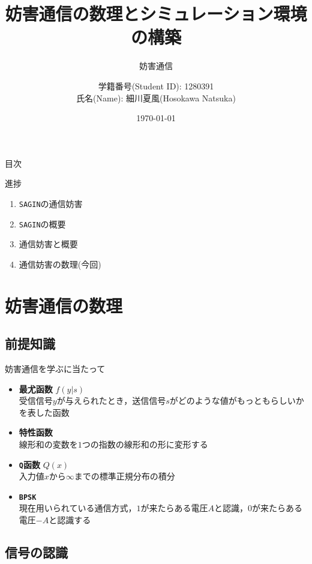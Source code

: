 \documentclass[11pt, aspectratio=169]{beamer}
\title{妨害通信の数理とシミュレーション環境の構築}
\subtitle{妨害通信}
\author{学籍番号(Student ID): 1280391 \\ 氏名(Name): 細川夏風(Hosokawa Natsuka)}
\institute{高知工科大学(Kochi Univ of Tech)}
\date{\today}
\begin{document}
\begin{frame}
  \titlepage
\end{frame}

\begin{frame}{目次}
  \tableofcontents
\end{frame}


\begin{frame}{進捗}
  \begin{enumerate}
    \item \texttt{SAGIN}の通信妨害
    \item \texttt{SAGIN}の概要
    \item 通信妨害と概要
    \item 通信妨害の数理(今回)
  \end{enumerate}
\end{frame}

\section{妨害通信の数理}
\subsection{前提知識}

\begin{frame}{妨害通信を学ぶに当たって}
  \begin{itemize}
    \item \textbf{最尤函数} $f(y|s)$ \\
      受信信号$y$が与えられたとき，送信信号$s$がどのような値がもっともらしいかを表した函数
    \item \textbf{特性函数} \\
      線形和の変数を$1$つの指数の線形和の形に変形する
    \item \textbf{\texttt{Q}函数} $Q(x)$\\
      入力値$x$から$\infty$までの標準正規分布の積分
    \item \textbf{\texttt{BPSK}} \\
      現在用いられている通信方式，$1$が来たらある電圧$A$と認識，$0$が来たらある電圧$-A$と認識する
  \end{itemize}
\end{frame}

\subsection{信号の認識}
\end{document}
